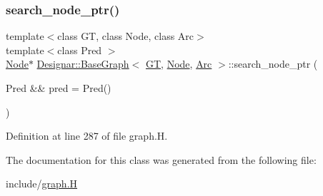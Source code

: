 \subsubsection{\texorpdfstring{search\+\_\+node\+\_\+ptr()}{search\_node\_ptr()}\hspace{0.1cm}{\footnotesize\ttfamily [2/2]}}
{\footnotesize\ttfamily template$<$class GT, class Node, class Arc$>$ \\
template$<$class Pred $>$ \\
\hyperlink{namespace_designar_a5af326c65aa2bd26b26c410f2030d09e}{Node}$\ast$ \hyperlink{class_designar_1_1_base_graph}{Designar\+::\+Base\+Graph}$<$ \hyperlink{demo-buildgraph_8_c_a3001c40d2c31ca87ed96cd7d1334a55e}{GT}, \hyperlink{namespace_designar_a5af326c65aa2bd26b26c410f2030d09e}{Node}, \hyperlink{namespace_designar_a3f55fb5513d62ff47cbc8f72b8e95d6f}{Arc} $>$\+::search\+\_\+node\+\_\+ptr (\begin{DoxyParamCaption}\item[{Pred \&\&}]{pred = {\ttfamily Pred()} }\end{DoxyParamCaption})\hspace{0.3cm}{\ttfamily [inline]}}



Definition at line 287 of file graph.\+H.



The documentation for this class was generated from the following file\+:\begin{DoxyCompactItemize}
\item 
include/\hyperlink{graph_8_h}{graph.\+H}\end{DoxyCompactItemize}
